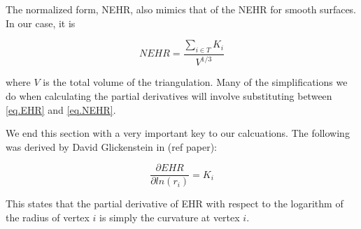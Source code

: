 \documentclass[12pt]{article}
\begin{document}
The normalized form, NEHR, also mimics that of the NEHR for smooth surfaces. In our case, it is

\begin{equation}
NEHR = \frac{\sum_{{i} \in T}{K_i}}{V^{1/3}}
\label{eq.NEHR}
\end{equation}

where $V$ is the total volume of the triangulation. Many of the simplifications we do when calculating the partial derivatives will involve substituting between \ref{eq.EHR} and \ref{eq.NEHR}.

We end this section with a very important key to our calcuations. The following was derived by David Glickenstein in (ref paper):

\begin{equation}
\frac{\partial EHR}{\partial ln(r_i)} = K_i
\label{eq.EHR_Part}
\end{equation}

This states that the partial derivative of EHR with respect to the logarithm of the radius of vertex ${i}$ is simply the curvature at vertex ${i}$.
\end{document}
